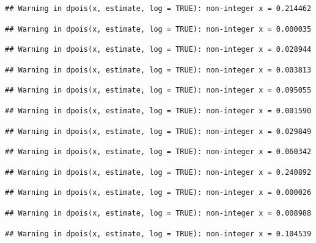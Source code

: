 \documentclass[]{article}
\begin{document}
\begin{verbatim}
## Warning in dpois(x, estimate, log = TRUE): non-integer x = 0.214462
\end{verbatim}

\begin{verbatim}
## Warning in dpois(x, estimate, log = TRUE): non-integer x = 0.000035
\end{verbatim}

\begin{verbatim}
## Warning in dpois(x, estimate, log = TRUE): non-integer x = 0.028944
\end{verbatim}

\begin{verbatim}
## Warning in dpois(x, estimate, log = TRUE): non-integer x = 0.003813
\end{verbatim}

\begin{verbatim}
## Warning in dpois(x, estimate, log = TRUE): non-integer x = 0.095055
\end{verbatim}

\begin{verbatim}
## Warning in dpois(x, estimate, log = TRUE): non-integer x = 0.001590
\end{verbatim}

\begin{verbatim}
## Warning in dpois(x, estimate, log = TRUE): non-integer x = 0.029849
\end{verbatim}

\begin{verbatim}
## Warning in dpois(x, estimate, log = TRUE): non-integer x = 0.060342
\end{verbatim}

\begin{verbatim}
## Warning in dpois(x, estimate, log = TRUE): non-integer x = 0.240892
\end{verbatim}

\begin{verbatim}
## Warning in dpois(x, estimate, log = TRUE): non-integer x = 0.000026
\end{verbatim}

\begin{verbatim}
## Warning in dpois(x, estimate, log = TRUE): non-integer x = 0.008988
\end{verbatim}

\begin{verbatim}
## Warning in dpois(x, estimate, log = TRUE): non-integer x = 0.104539
\end{verbatim}
\end{document}
